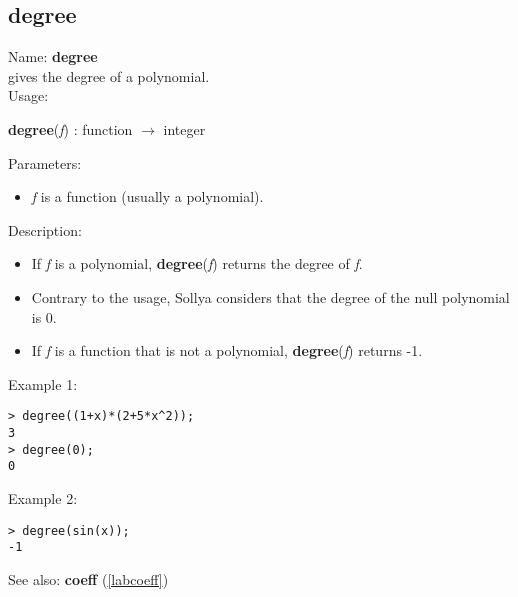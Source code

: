 \subsection{degree}
\label{labdegree}
\noindent Name: \textbf{degree}\\
gives the degree of a polynomial.\\

\noindent Usage: 
\begin{center}
\textbf{degree}(\emph{f}) : \textsf{function} $\rightarrow$ \textsf{integer}\\
\end{center}
Parameters: 
\begin{itemize}
\item \emph{f} is a function (usually a polynomial).
\end{itemize}
\noindent Description: \begin{itemize}

\item If \emph{f} is a polynomial, \textbf{degree}(\emph{f}) returns the degree of \emph{f}.

\item Contrary to the usage, Sollya considers that the degree of the null polynomial
   is 0.

\item If \emph{f} is a function that is not a polynomial, \textbf{degree}(\emph{f}) returns -1.
\end{itemize}
\noindent Example 1: 
\begin{center}\begin{minipage}{15cm}\begin{Verbatim}[frame=single]
> degree((1+x)*(2+5*x^2));
3
> degree(0);
0
\end{Verbatim}
\end{minipage}\end{center}
\noindent Example 2: 
\begin{center}\begin{minipage}{15cm}\begin{Verbatim}[frame=single]
> degree(sin(x));
-1
\end{Verbatim}
\end{minipage}\end{center}
See also: \textbf{coeff} (\ref{labcoeff})
